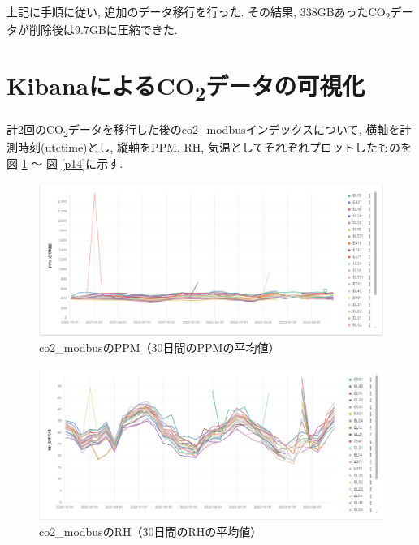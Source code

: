 上記に手順に従い, 追加のデータ移行を行った.
その結果, 338GBあったCO\textsubscript{2}データが削除後は9.7GBに圧縮できた.

\section{KibanaによるCO\textsubscript{2}データの可視化}

計2回のCO\textsubscript{2}データを移行した後のco2\_modbusインデックスについて, 横軸を計測時刻(utctime)とし, 縦軸をPPM, RH, 気温としてそれぞれプロットしたものを図 \ref{p12} 〜 図 \ref{p14}に示す.

\begin{figure}[H]
  \hspace*{-2cm} %
  \centering %
  \includegraphics[width=170mm]{sotu/figure/ppm.png}
  \caption{co2\_modbusのPPM（30日間のPPMの平均値）}
  \label{p12}
\end{figure}

\begin{figure}[H]
  \hspace*{-2cm} %
  \centering %
  \includegraphics[width=170mm]{sotu/figure/rh.png}
  \caption{co2\_modbusのRH（30日間のRHの平均値）}
  \label{p13}
\end{figure}

